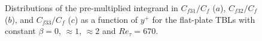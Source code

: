 




\begin{figure}
\subfigure{\texttt{[image: 4a]}\label{beta_cf3:a}}
\subfigure{\texttt{[image: 4b]}\label{beta_cf3:b}}
\subfigure{\texttt{[image: 4c]}\label{beta_cf3:c}}
\caption{Distributions of the pre-multiplied integrand in $C_{f31}/C_f$ ($a$), $C_{f32}/C_f$ ($b$), and $C_{f33}/C_f$ ($c$) as a function of $y^+$ for the flat-plate TBLs with constant $\beta=0$, $\approx1$, $\approx2$ and $Re_\tau=670$.}
\label{beta_cf3}
\end{figure}

%


